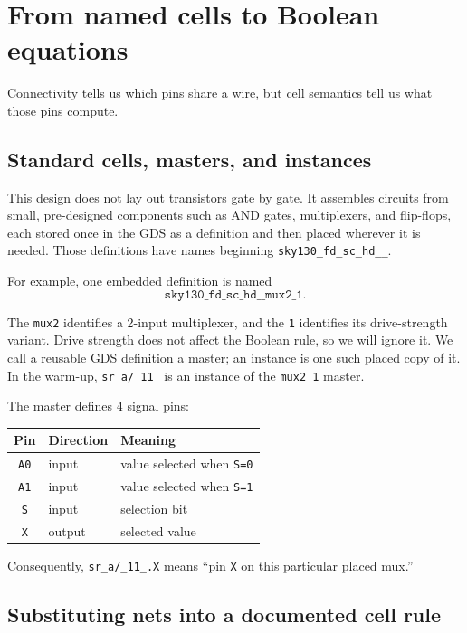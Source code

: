 \documentclass[11pt]{article}
\begin{document}
\section{From named cells to Boolean equations}

Connectivity tells us which pins share a wire, but cell semantics tell us what those pins compute.

\subsection{Standard cells, masters, and instances}

This design does not lay out transistors gate by gate. It assembles circuits from small, pre-designed components such as AND gates, multiplexers, and flip-flops, each stored once in the GDS as a definition and then placed wherever it is needed. Those definitions have names beginning \texttt{sky130\_fd\_sc\_hd\_\_}.

For example, one embedded definition is named
\[
  \texttt{sky130\_fd\_sc\_hd\_\_mux2\_1}.
\]

The \texttt{mux2} identifies a 2-input multiplexer, and the \texttt{1} identifies its drive-strength variant. Drive strength does not affect the Boolean rule, so we will ignore it. We call a reusable GDS definition a master; an instance is one such placed copy of it. In the warm-up, \texttt{sr\_a/\_11\_} is an instance of the \texttt{mux2\_1} master.

The master defines 4 signal pins:

\begin{center}
  \begin{tabular}{@{}cll@{}}
    \toprule
    Pin & Direction & Meaning \\
    \midrule
    \texttt{A0} & input  & value selected when \texttt{S=0} \\
    \texttt{A1} & input  & value selected when \texttt{S=1} \\
    \texttt{S}  & input  & selection bit \\
    \texttt{X}  & output & selected value \\
    \bottomrule
  \end{tabular}
\end{center}

Consequently, \texttt{sr\_a/\_11\_.X} means ``pin \texttt{X} on this particular placed mux.''

\subsection{Substituting nets into a documented cell rule}
\end{document}
